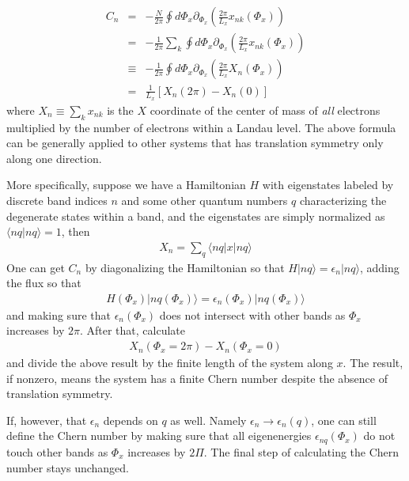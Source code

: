 \begin{eqnarray}
	C_n &=& -\frac{N}{2\pi} \oint d\Phi_x\partial_{\Phi_x}  \left( \frac{2\pi}{L_x}x_{nk}(\Phi_x) \right)\\\nonumber
	&=& -\frac{1}{2\pi} \sum_k \oint d\Phi_x\partial_{\Phi_x}  \left( \frac{2\pi}{L_x}x_{nk}(\Phi_x) \right) \\\nonumber
	&\equiv& -\frac{1}{2\pi} \oint d\Phi_x\partial_{\Phi_x}  \left( \frac{2\pi}{L_x}X_{n}(\Phi_x) \right)\\\nonumber
	&=& \frac{1}{L_x}\left[X_n(2\pi) - X_n(0)\right]
\end{eqnarray}
where $X_{n}\equiv \sum_k x_{nk}$ is the $X$ coordinate of the center of mass of \emph{all} electrons multiplied by the number of electrons within a Landau level. The above formula can be generally applied to other systems that has translation symmetry only along one direction.

More specifically, suppose we have a Hamiltonian $H$ with eigenstates labeled by discrete band indices $n$ and some other quantum numbers $q$ characterizing the degenerate states within a band, and the eigenstates are simply normalized as $\langle nq | nq\rangle =1$, then
\begin{eqnarray}
	X_n = \sum_{q} \langle nq | x | nq \rangle
\end{eqnarray}
One can get $C_n$ by diagonalizing the Hamiltonian so that $H|nq\rangle = \epsilon_n |nq\rangle$, adding the flux so that
\begin{eqnarray}
	H(\Phi_x) | nq (\Phi_x)\rangle = \epsilon_n(\Phi_x) | nq (\Phi_x)\rangle
\end{eqnarray}
and making sure that $\epsilon_n(\Phi_x)$ does not intersect with other bands as $\Phi_x$ increases by $2\pi$. After that, calculate
\begin{eqnarray}
	X_n(\Phi_x = 2\pi) - X_n(\Phi_x = 0)
\end{eqnarray}
and divide the above result by the finite length of the system along $x$. The result, if nonzero, means the system has a finite Chern number despite the absence of translation symmetry.

If, however, that $\epsilon_n$ depends on $q$ as well. Namely $\epsilon_n\rightarrow \epsilon_n(q)$, one can still define the Chern number by making sure that all eigenenergies $\epsilon_{nq}(\Phi_x)$ do not touch other bands as $\Phi_x$ increases by $2\Pi$. The final step of calculating the Chern number stays unchanged.

%
%
%

